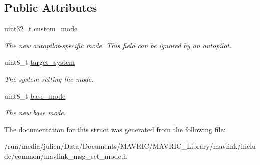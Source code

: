 \subsection*{Public Attributes}
\begin{DoxyCompactItemize}
\item 
\hypertarget{struct____mavlink__set__mode__t_ab932915605e53ff1f42c57f3159b63f6}{uint32\+\_\+t \hyperlink{struct____mavlink__set__mode__t_ab932915605e53ff1f42c57f3159b63f6}{custom\+\_\+mode}}\label{struct____mavlink__set__mode__t_ab932915605e53ff1f42c57f3159b63f6}

\begin{DoxyCompactList}\small\item\em The new autopilot-\/specific mode. This field can be ignored by an autopilot. \end{DoxyCompactList}\item 
\hypertarget{struct____mavlink__set__mode__t_a58cf8afdf2920c038cae4645c79ac372}{uint8\+\_\+t \hyperlink{struct____mavlink__set__mode__t_a58cf8afdf2920c038cae4645c79ac372}{target\+\_\+system}}\label{struct____mavlink__set__mode__t_a58cf8afdf2920c038cae4645c79ac372}

\begin{DoxyCompactList}\small\item\em The system setting the mode. \end{DoxyCompactList}\item 
\hypertarget{struct____mavlink__set__mode__t_a7a48085507fabce566221fb4ede8c8a6}{uint8\+\_\+t \hyperlink{struct____mavlink__set__mode__t_a7a48085507fabce566221fb4ede8c8a6}{base\+\_\+mode}}\label{struct____mavlink__set__mode__t_a7a48085507fabce566221fb4ede8c8a6}

\begin{DoxyCompactList}\small\item\em The new base mode. \end{DoxyCompactList}\end{DoxyCompactItemize}


The documentation for this struct was generated from the following file\+:\begin{DoxyCompactItemize}
\item 
/run/media/julien/\+Data/\+Documents/\+M\+A\+V\+R\+I\+C/\+M\+A\+V\+R\+I\+C\+\_\+\+Library/mavlink/include/common/mavlink\+\_\+msg\+\_\+set\+\_\+mode.\+h\end{DoxyCompactItemize}
